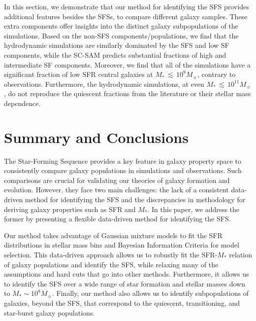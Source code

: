 \documentclass[tighten, preprint]{aastex62}
\begin{document}
In this section, we demonstrate that our method for identifying the SFS
provides additional features besides the SFSs, to compare different galaxy 
samples. These extra components offer insights into the 
distinct galaxy subpopulations of the simulations. Based on the non-SFS 
components/populations, we find that the hydrodynamic simulations are 
similarly dominated by the SFS and low SF components, while the SC-SAM 
predicts substantial fractions of high and intermediate SF components. 
Moreover, we find that all of the simulations have a significant
fraction of low SFR central galaxies at $M_*\,{\lesssim}\,10^9M_\sun$, 
contrary to observations. Furthermore, the hydrodynamic simulations, at 
even $M_*\,{\lesssim}\,10^{11}M_\sun$, do not reproduce the quiescent 
fractions from the literature or their stellar mass dependence. 

\section{Summary and Conclusions} \label{sec:summary}
The Star-Forming Sequence provides a key feature in galaxy property 
space to consistently compare %
galaxy populations in simulations and observations.
Such comparisons are crucial for validating our theories of
galaxy formation and evolution. However, they face two main challenges: 
the lack of a consistent data-driven method for identifying the SFS and 
the discrepancies in methodology for deriving galaxy properties such as 
SFR and $M_*$. In this paper, we address the former by presenting 
a flexible data-driven method for identifying the SFS. 

Our method takes advantage of Gaussian mixture models to fit the SFR
distributions in stellar mass bins and Bayesian Information Criteria 
for model selection. This data-driven approach allows us to robustly 
fit the SFR-$M_*$ relation of galaxy populations and identify the SFS, 
while relaxing many of the assumptions and hard cuts that go into 
other methods. Furthermore, it allows us to identify the SFS over a wide 
range of star formation and stellar masses down to 
$M_*{\sim}10^{8}M_\sun$. Finally, our method also allows us to identify 
subpopulations of galaxies, beyond the SFS, that correspond to the 
quiescent, transitioning, and star-burst galaxy populations. 
\end{document}

